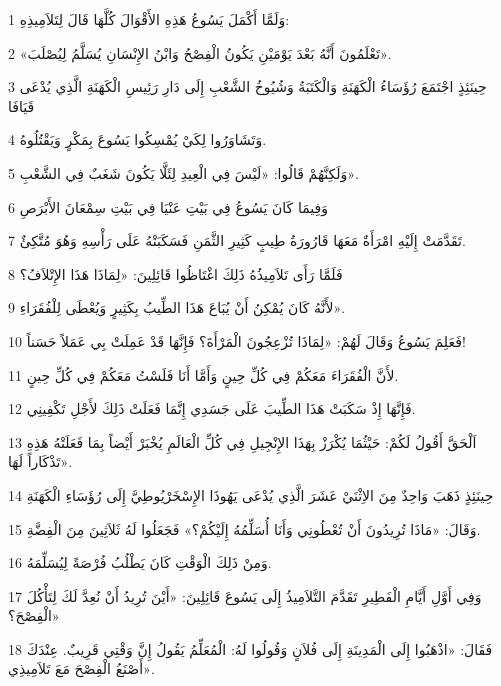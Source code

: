 \par 1 وَلَمَّا أَكْمَلَ يَسُوعُ هَذِهِ الأَقْوَالَ كُلَّهَا قَالَ لِتَلاَمِيذِهِ:
\par 2 «تَعْلَمُونَ أَنَّهُ بَعْدَ يَوْمَيْنِ يَكُونُ الْفِصْحُ وَابْنُ الإِنْسَانِ يُسَلَّمُ لِيُصْلَبَ».
\par 3 حِينَئِذٍ اجْتَمَعَ رُؤَسَاءُ الْكَهَنَةِ وَالْكَتَبَةُ وَشُيُوخُ الشَّعْبِ إِلَى دَارِ رَئِيسِ الْكَهَنَةِ الَّذِي يُدْعَى قَيَافَا
\par 4 وَتَشَاوَرُوا لِكَيْ يُمْسِكُوا يَسُوعَ بِمَكْرٍ وَيَقْتُلُوهُ.
\par 5 وَلَكِنَّهُمْ قَالُوا: «لَيْسَ فِي الْعِيدِ لِئَلَّا يَكُونَ شَغَبٌ فِي الشَّعْبِ».
\par 6 وَفِيمَا كَانَ يَسُوعُ فِي بَيْتِ عَنْيَا فِي بَيْتِ سِمْعَانَ الأَبْرَصِ
\par 7 تَقَدَّمَتْ إِلَيْهِ امْرَأَةٌ مَعَهَا قَارُورَةُ طِيبٍ كَثِيرِ الثَّمَنِ فَسَكَبَتْهُ عَلَى رَأْسِهِ وَهُوَ مُتَّكِئٌ.
\par 8 فَلَمَّا رَأَى تَلاَمِيذُهُ ذَلِكَ اغْتَاظُوا قَائِلِينَ: «لِمَاذَا هَذَا الإِتْلاَفُ؟
\par 9 لأَنَّهُ كَانَ يُمْكِنُ أَنْ يُبَاعَ هَذَا الطِّيبُ بِكَثِيرٍ وَيُعْطَى لِلْفُقَرَاءِ».
\par 10 فَعَلِمَ يَسُوعُ وَقَالَ لَهُمْ: «لِمَاذَا تُزْعِجُونَ الْمَرْأَةَ؟ فَإِنَّهَا قَدْ عَمِلَتْ بِي عَمَلاً حَسَناً!
\par 11 لأَنَّ الْفُقَرَاءَ مَعَكُمْ فِي كُلِّ حِينٍ وَأَمَّا أَنَا فَلَسْتُ مَعَكُمْ فِي كُلِّ حِينٍ.
\par 12 فَإِنَّهَا إِذْ سَكَبَتْ هَذَا الطِّيبَ عَلَى جَسَدِي إِنَّمَا فَعَلَتْ ذَلِكَ لأَجْلِ تَكْفِينِي.
\par 13 اَلْحَقَّ أَقُولُ لَكُمْ: حَيْثُمَا يُكْرَزْ بِهَذَا الإِنْجِيلِ فِي كُلِّ الْعَالَمِ يُخْبَرْ أَيْضاً بِمَا فَعَلَتْهُ هَذِهِ تَذْكَاراً لَهَا».
\par 14 حِينَئِذٍ ذَهَبَ وَاحِدٌ مِنَ الاِثْنَيْ عَشَرَ الَّذِي يُدْعَى يَهُوذَا الإِسْخَرْيُوطِيَّ إِلَى رُؤَسَاءِ الْكَهَنَةِ
\par 15 وَقَالَ: «مَاذَا تُرِيدُونَ أَنْ تُعْطُونِي وَأَنَا أُسَلِّمُهُ إِلَيْكُمْ؟» فَجَعَلُوا لَهُ ثَلاَثِينَ مِنَ الْفِضَّةِ.
\par 16 وَمِنْ ذَلِكَ الْوَقْتِ كَانَ يَطْلُبُ فُرْصَةً لِيُسَلِّمَهُ.
\par 17 وَفِي أَوَّلِ أَيَّامِ الْفَطِيرِ تَقَدَّمَ التَّلاَمِيذُ إِلَى يَسُوعَ قَائِلِينَ: «أَيْنَ تُرِيدُ أَنْ نُعِدَّ لَكَ لِتَأْكُلَ الْفِصْحَ؟»
\par 18 فَقَالَ: «اذْهَبُوا إِلَى الْمَدِينَةِ إِلَى فُلاَنٍ وَقُولُوا لَهُ: الْمُعَلِّمُ يَقُولُ إِنَّ وَقْتِي قَرِيبٌ. عِنْدَكَ أَصْنَعُ الْفِصْحَ مَعَ تَلاَمِيذِي».

